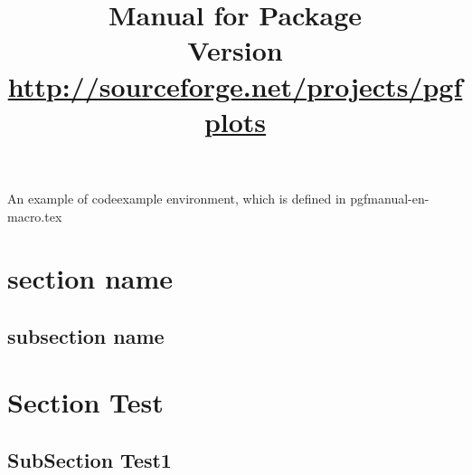 \documentclass[a4paper]{ltxdoc}
\title{%
	Manual for Package \PGFPlots\\
	{\small Version \pgfplotsversion}\\
	{\small\href{http://sourceforge.net/projects/pgfplots}{http://sourceforge.net/projects/pgfplots}}}
\begin{document}



An example of codeexample environment, which is defined in pgfmanual-en-macro.tex



\begin{codeexample}[]
%
\end{codeexample}

\section{section name} %
\label{sec:section_name}



\subsection{subsection name} %
\label{sub:subsection_name}


\section{Section Test}

\subsection{SubSection Test1}
\label{sub:subsec1}
\end{document}
